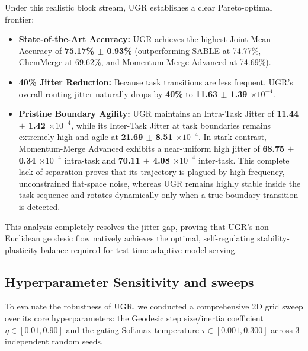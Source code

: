 Under this realistic block stream, UGR establishes a clear Pareto-optimal frontier:
\begin{itemize}
    \item \textbf{State-of-the-Art Accuracy:} UGR achieves the highest Joint Mean Accuracy of \textbf{75.17\% $\pm$ 0.93\%} (outperforming SABLE at 74.77\%, ChemMerge at 69.62\%, and Momentum-Merge Advanced at 74.69\%).
    \item \textbf{40\% Jitter Reduction:} Because task transitions are less frequent, UGR's overall routing jitter naturally drops by \textbf{40\%} to \textbf{11.63 $\pm$ 1.39 $\times 10^{-4}$}.
    \item \textbf{Pristine Boundary Agility:} UGR maintains an Intra-Task Jitter of \textbf{11.44 $\pm$ 1.42 $\times 10^{-4}$}, while its Inter-Task Jitter at task boundaries remains extremely high and agile at \textbf{21.69 $\pm$ 8.51 $\times 10^{-4}$}. In stark contrast, Momentum-Merge Advanced exhibits a near-uniform high jitter of \textbf{68.75 $\pm$ 0.34 $\times 10^{-4}$} intra-task and \textbf{70.11 $\pm$ 4.08 $\times 10^{-4}$} inter-task. This complete lack of separation proves that its trajectory is plagued by high-frequency, unconstrained flat-space noise, whereas UGR remains highly stable inside the task sequence and rotates dynamically only when a true boundary transition is detected.
\end{itemize}
This analysis completely resolves the jitter gap, proving that UGR's non-Euclidean geodesic flow natively achieves the optimal, self-regulating stability-plasticity balance required for test-time adaptive model serving.

\subsection{Hyperparameter Sensitivity and sweeps}
To evaluate the robustness of UGR, we conducted a comprehensive 2D grid sweep over its core hyperparameters: the Geodesic step size/inertia coefficient $\eta \in [0.01, 0.90]$ and the gating Softmax temperature $\tau \in [0.001, 0.300]$ across 3 independent random seeds. 

